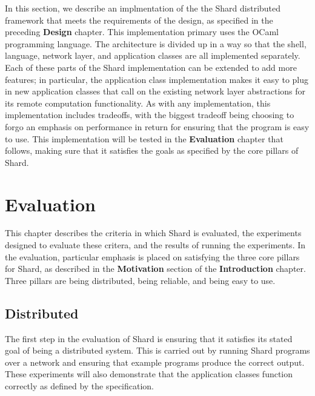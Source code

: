 \documentclass[twoside]{report}
\begin{document}
In this section, we describe an implmentation of the the Shard distributed framework that meets the requirements of the design, as specified in the preceding \textbf{Design} chapter.
This implementation primary uses the OCaml programming language.
The architecture is divided up in a way so that the shell, language, network layer, and application classes are all implemented separately.
Each of these parts of the Shard implementation can be extended to add more features; in particular, the application class implementation makes it easy to plug in new application classes that call on the existing network layer abstractions for its remote computation functionality.
As with any implementation, this implementation includes tradeoffs, with the biggest tradeoff being choosing to forgo an emphasis on performance in return for ensuring that the program is easy to use.
This implementation will be tested in the \textbf{Evaluation} chapter that follows, making sure that it satisfies the goals as specified by the core pillars of Shard.


\chapter{Evaluation}

This chapter describes the criteria in which Shard is evaluated, the experiments designed to evaluate these critera, and the results of running the experiments.
In the evaluation, particular emphasis is placed on satisfying the three core pillars for Shard, as described in the \textbf{Motivation} section of the \textbf{Introduction} chapter.
Three pillars are being distributed, being reliable, and being easy to use.

\section{Distributed}

The first step in the evaluation of Shard is ensuring that it satisfies its stated goal of being a distributed system.
This is carried out by running Shard programs over a network and ensuring that example programs produce the correct output.
These experiments will also demonstrate that the application classes function correctly as defined by the specification.
\end{document}
